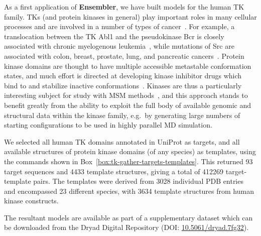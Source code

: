 \documentclass[aps,pre,twocolumn,nofootinbib,superscriptaddress,linenumbers]{revtex4-1}
\begin{document}
As a first application of {\bf Ensembler}, we have built models for the human TK family.
TKs (and protein kinases in general) play important roles in many cellular processes and are involved in a number of types of cancer~\cite{krause:nejm:2005:tks-cancer}.
For example, a translocation between the TK Abl1 and the pseudokinase Bcr is closely associated with chronic myelogenous leukemia~\cite{greuber:2013:abl-cancer-review}, while mutations of Src are associated with colon, breast, prostate, lung, and pancreatic cancers~\cite{kim:2009:src-cancer-review}.
Protein kinase domains are thought to have multiple accessible metastable conformation states, and much effort is directed at developing kinase inhibitor drugs which bind to and stabilize inactive conformations~\cite{liu:ncb:2006:kinase-inhibitors-inactive-conformations}.
Kinases are thus a particularly interesting subject for study with MSM methods~\cite{shukla-pande:nature-commun:2014:src-activation-msm}, and this approach stands to benefit greatly from the ability to exploit the full body of available genomic and structural data within the kinase family, e.g.~by generating large numbers of starting configurations to be used in highly parallel MD simulation.

We selected all human TK domains annotated in UniProt as targets, and all available structures of protein kinase domains (of any species) as templates, using the commands shown in Box~\ref{box:tk-gather-targets-templates}.
This returned 93 target sequences and 4433 template structures, giving a total of \num{412269} target-template pairs.
The templates were derived from 3028 individual PDB entries and encompassed 23 different species, with 3634 template structures from human kinase constructs.

The resultant models are available as part of a supplementary dataset which can be downloaded from the Dryad Digital Repository (DOI: \href{http://datadryad.org/review?doi=doi:10.5061/dryad.7fg32}{10.5061/dryad.7fg32}).
\end{document}
